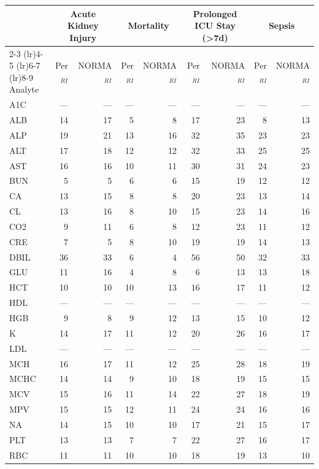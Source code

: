 \begin{table}[ht]
\centering
\footnotesize
\begin{tabular}{lrrrrrrrr}
\toprule
 & \multicolumn{2}{c}{Acute Kidney Injury} & \multicolumn{2}{c}{Mortality} & \multicolumn{2}{c}{Prolonged ICU Stay (>7d)} & \multicolumn{2}{c}{Sepsis} \\
\cmidrule(lr){2-3} \cmidrule(lr){4-5} \cmidrule(lr){6-7} \cmidrule(lr){8-9}
Analyte & Per$_{RI}$ & NORMA$_{RI}$ & Per$_{RI}$ & NORMA$_{RI}$ & Per$_{RI}$ & NORMA$_{RI}$ & Per$_{RI}$ & NORMA$_{RI}$ \\
\midrule
A1C & --- & --- & --- & --- & --- & --- & --- & --- \\
ALB & 14 & 17 & 5 & 8 & 17 & 23 & 8 & 13 \\
ALP & 19 & 21 & 13 & 16 & 32 & 35 & 23 & 23 \\
ALT & 17 & 18 & 12 & 12 & 32 & 33 & 25 & 25 \\
AST & 16 & 16 & 10 & 11 & 30 & 31 & 24 & 23 \\
BUN & 5 & 5 & 6 & 6 & 15 & 19 & 12 & 12 \\
CA & 13 & 15 & 8 & 8 & 20 & 23 & 13 & 14 \\
CL & 13 & 16 & 8 & 10 & 15 & 23 & 14 & 16 \\
CO2 & 9 & 11 & 6 & 8 & 12 & 23 & 11 & 12 \\
CRE & 7 & 5 & 8 & 10 & 19 & 19 & 14 & 13 \\
DBIL & 36 & 33 & 6 & 4 & 56 & 50 & 32 & 33 \\
GLU & 11 & 16 & 4 & 8 & 6 & 13 & 13 & 18 \\
HCT & 10 & 10 & 10 & 13 & 16 & 17 & 11 & 12 \\
HDL & --- & --- & --- & --- & --- & --- & --- & --- \\
HGB & 9 & 8 & 9 & 12 & 13 & 15 & 10 & 12 \\
K & 14 & 17 & 11 & 12 & 20 & 26 & 16 & 17 \\
LDL & --- & --- & --- & --- & --- & --- & --- & --- \\
MCH & 16 & 17 & 11 & 12 & 25 & 28 & 18 & 19 \\
MCHC & 14 & 14 & 9 & 10 & 18 & 19 & 15 & 15 \\
MCV & 15 & 16 & 11 & 14 & 22 & 27 & 18 & 19 \\
MPV & 15 & 15 & 12 & 11 & 24 & 24 & 16 & 16 \\
NA & 14 & 15 & 10 & 10 & 17 & 21 & 15 & 17 \\
PLT & 13 & 13 & 7 & 7 & 22 & 27 & 16 & 17 \\
RBC & 11 & 11 & 10 & 10 & 18 & 19 & 13 & 10 \\

\end{tabular}
\end{table}

